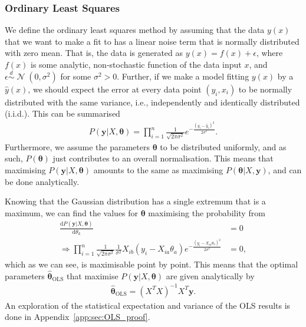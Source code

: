 \documentclass[twocolumn,english,notitlepage]{article}
\renewcommand{\d}[2][x]{\ensuremath{\frac{\mathrm{d}#2}{\mathrm{d}#1}}}
\renewcommand{\vec}[1]{\boldsymbol{#1}}
\newcommand{\pclosed}[1]{\left(#1\right)}
\renewcommand{\exp}[1]{e^{#1}}
\newcommand{\normal}[2]{\operatorname{\mathcal{N}}\pclosed{#1,#2}}
\newcommand{\distas}{\overset{d}{\sim}}
\newcommand{\msub}[2]{\ensuremath{{#1}_\text{#2}}}
\begin{document}
        \subsubsection{Ordinary Least Squares}
            We define the ordinary least squares method by assuming that the data $y(x)$ that we want to make a fit to has a linear noise term that is normally distributed with zero mean. That is, the data is generated as $y(x) = f(x) + \epsilon$, where $f(x)$ is some analytic, non-stochastic function of the data input $x$, and $\epsilon \distas \normal{0}{\sigma^2}$ for some $\sigma^2>0$. Further, if we make a model fitting $y(x)$ by a $\hat{y}(x)$, we should expect the error at every data point $(y_i, x_i)$ to be normally distributed with the same variance, i.e., independently and identically distributed (i.i.d.). This can be summarised
            \begin{align}
                P(\vec{y}|X, \vec{\theta}) = \prod_{i=1}^{n} \frac{1}{\sqrt{2\pi\sigma^2}} \exp{-\frac{{(y_i-\hat{y}_i)}^2}{2\sigma^2}}.
            \end{align}
            Furthermore, we assume the parameters $\vec{\theta}$ to be distributed uniformly, and as such, $P(\vec{\theta})$ just contributes to an overall normalisation. This means that maximising $P(\vec{y}|X, \vec{\theta})$ amounts to the same as maximising $P(\vec{\theta}|X, \vec{y})$, and can be done analytically.

            Knowing that the Gaussian distribution has a single extremum that is a maximum, we can find the values for $\vec{\theta}$ maximising the probability from
            \begin{align} \nonumber
                \d[\theta_k]{P(\vec{y}|X,\vec{\theta})} &= 0 \\
                \Rightarrow \prod_{i=1}^{n} \frac{1}{\sqrt{2\pi\sigma^2}} \frac{1}{\sigma^2} X_{ib}(y_i-X_{ia}\theta_a) \exp{-\frac{{(y_i - X_{ia}\theta_a)}^2}{2\sigma^2}} &= 0,
            \end{align}
            which as we can see, is maximisable point by point. This means that the optimal parameters $\msub{\vec{\hat{\theta}}}{OLS}$ that maximise $P(\vec{y}|X, \vec{\theta})$ are given analytically by
            \begin{align}
                \boxed{
                    \msub{\vec{\hat{\theta}}}{OLS} = \pclosed{X^TX}^{-1} X^T \vec{y}.
                    \label{theo:eq:OLS_coefs}
                }
            \end{align}
            An exploration of the statistical expectation and variance of the OLS results is done in Appendix~\ref{app:sec:OLS_proof}.
\end{document}

